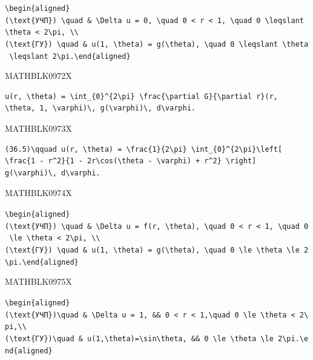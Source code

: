 \documentclass[
  ukrainian,
]{article}
\begin{document}
\texttt{\textbackslash{}begin\{aligned\}(\textbackslash{}text\{УЧП\})\ \textbackslash{}quad\ \&\ \textbackslash{}Delta\ u\ =\ 0,\ \textbackslash{}quad\ 0\ \textless{}\ r\ \textless{}\ 1,\ \textbackslash{}quad\ 0\ \textbackslash{}leqslant\ \textbackslash{}theta\ \textless{}\ 2\textbackslash{}pi,\ \textbackslash{}\textbackslash{}(\textbackslash{}text\{ГУ\})\ \textbackslash{}quad\ \&\ u(1,\ \textbackslash{}theta)\ =\ g(\textbackslash{}theta),\ \textbackslash{}quad\ 0\ \textbackslash{}leqslant\ \textbackslash{}theta\ \textbackslash{}leqslant\ 2\textbackslash{}pi.\textbackslash{}end\{aligned\}}

MATHBLK0972X

\begin{verbatim}
u(r, \theta) = \int_{0}^{2\pi} \frac{\partial G}{\partial r}(r, \theta, 1, \varphi)\, g(\varphi)\, d\varphi.
\end{verbatim}

MATHBLK0973X

\begin{verbatim}
(36.5)\qquad u(r, \theta) = \frac{1}{2\pi} \int_{0}^{2\pi}\left[ \frac{1 - r^2}{1 - 2r\cos(\theta - \varphi) + r^2} \right] g(\varphi)\, d\varphi.
\end{verbatim}

MATHBLK0974X

\texttt{\textbackslash{}begin\{aligned\}(\textbackslash{}text\{УЧП\})\ \textbackslash{}quad\ \&\ \textbackslash{}Delta\ u\ =\ f(r,\ \textbackslash{}theta),\ \textbackslash{}quad\ 0\ \textless{}\ r\ \textless{}\ 1,\ \textbackslash{}quad\ 0\ \textbackslash{}le\ \textbackslash{}theta\ \textless{}\ 2\textbackslash{}pi,\ \textbackslash{}\textbackslash{}(\textbackslash{}text\{ГУ\})\ \textbackslash{}quad\ \&\ u(1,\ \textbackslash{}theta)\ =\ g(\textbackslash{}theta),\ \textbackslash{}quad\ 0\ \textbackslash{}le\ \textbackslash{}theta\ \textbackslash{}le\ 2\textbackslash{}pi.\textbackslash{}end\{aligned\}}

MATHBLK0975X

\texttt{\textbackslash{}begin\{aligned\}(\textbackslash{}text\{УЧП\})\textbackslash{}quad\ \&\ \textbackslash{}Delta\ u\ =\ 1,\ \&\&\ 0\ \textless{}\ r\ \textless{}\ 1,\textbackslash{}quad\ 0\ \textbackslash{}le\ \textbackslash{}theta\ \textless{}\ 2\textbackslash{}pi,\textbackslash{}\textbackslash{}(\textbackslash{}text\{ГУ\})\textbackslash{}quad\ \&\ u(1,\textbackslash{}theta)=\textbackslash{}sin\textbackslash{}theta,\ \&\&\ 0\ \textbackslash{}le\ \textbackslash{}theta\ \textbackslash{}le\ 2\textbackslash{}pi.\textbackslash{}end\{aligned\}}
\end{document}
